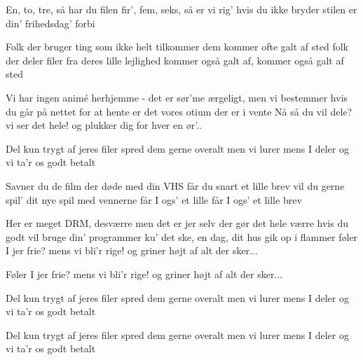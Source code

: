 \documentclass[a4paper,11pt]{article}
\begin{document}
\begin{song}

%
  En, to, tre, så har du filen
  fir', fem, seks, så er vi rig'
  hvis du ikke bryder stilen
  er din' frihedsdag' forbi

%
  Folk der bruger ting som
  ikke helt tilkommer dem
%
  kommer ofte galt af sted
%
  folk der deler filer fra
  deres lille lejlighed
%
  kommer også galt af,
%
  kommer også galt af sted

%
  Vi har ingen animé herhjemme
  - det er sør'me ærgeligt, men 
%
  vi bestemmer
%
  hvis du går på nettet for at hente
  er det vores otium der 
%
  er i vente
%
  Nå så du vil dele?
%
  vi ser det hele!
  og plukker dig for hver en ør'..


%
  Del kun trygt af jeres filer
  spred dem gerne overalt
  men vi lurer mens I deler
  og vi ta'r os godt betalt

%
  Savner du de film der 
  døde med din VHS
%
  får du snart et lille brev
%
  vil du gerne spil' dit nye spil med vennerne
%
  får I ogs' et lille
%
  får I ogs' et lille brev

%
  Her er meget DRM, desværre
  men det er jer selv der gør det 
%
  hele værre
%
  hvis du godt vil bruge din' programmer
  ku' det ske, en dag, dit hus gik 
%
  op i flammer
%
  føler I jer frie?
%
  mens vi bli'r rige!
  og griner højt af alt der sker...


%
  Føler I jer frie?
%
  mens vi bli'r rige!
  og griner højt af alt der sker...

%
  Del kun trygt af jeres filer
  spred dem gerne overalt
  men vi lurer mens I deler
  og vi ta'r os godt betalt

  Del kun trygt af jeres filer
  spred dem gerne overalt
  men vi lurer mens I deler
  og vi ta'r os godt betalt

\end{song}
\end{document}

